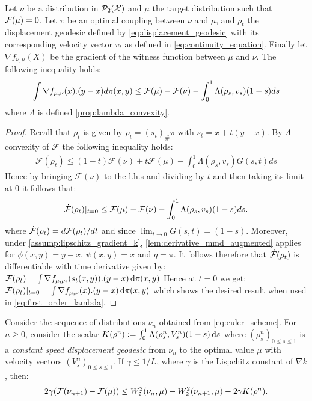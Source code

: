 \begin{lemma}	\label{lem:grad_flow_lambda_version}
	Let $\nu$ be a distribution in $\mathcal{P}_2({{\mathcal X}})$ and $\mu$ the target distribution such that ${{\mathcal F}}(\mu)=0$.  Let $\pi$ be an optimal coupling between $\nu$ and $\mu$, and $\rho_t$ the displacement geodesic defined by \cref{eq:displacement_geodesic} with its corresponding velocity vector  $v_t$ as defined in \cref{eq:continuity_equation}. Finally let $\nabla f_{\nu,\mu}(X)$ be the gradient of the witness function between $\mu$ and $\nu$. The following inequality holds: %
	\begin{align*}
	\int \nabla f_{\mu, \nu}(x).(y-x) d\pi(x,y)
	\leq
	{{\mathcal F}}(\mu)- {{\mathcal F}}(\nu) -\int_0^1 \Lambda(\rho_s,v_s)(1-s)ds
	\end{align*}
	where $\Lambda$ is defined \cref{prop:lambda_convexity}.
\end{lemma}
\begin{proof}
	Recall that $\rho_t$ is given by $\rho_t = (s_t)_{\#}\pi$ with $s_t = x + t(y-x)$. By $\Lambda$-convexity of $\mathcal{F}$ the following inequality holds:
	\begin{align*}
	\mathcal{F}(\rho_{t})\leq (1-t)\mathcal{F}(\nu)+t \mathcal{F}(\mu) - \int_0^1 \Lambda(\rho_s,v_s)G(s,t)ds
	\end{align*}
	Hence by bringing $\mathcal{F}(\nu)$ to the l.h.s and dividing by $t$ and then taking its limit at $0$ it follows that:
	\begin{align}\label{eq:first_order_lambda}
	\dot{{{\mathcal F}}}(\rho_t)\vert_{t=0}\leq \mathcal	{F}(\mu)-\mathcal{F}(\nu)-\int_0^1 \Lambda(\rho_s,v_s)(1-s)ds.	
	\end{align}
	where $\dot{{{\mathcal F}}}(\rho_t)=d{{\mathcal F}}(\rho_t)/dt$ and since $\lim_{t \rightarrow 0}G(s,t)=(1-s)$.
	Moreover, under \cref{assump:lipschitz_gradient_k}, \cref{lem:derivative_mmd_augmented} applies for $\phi(x,y) = y-x$, $\psi(x,y)= x$ and $q = \pi$. It follows therefore that $\dot{{{\mathcal F}}}(\rho_t)$ is differentiable with time derivative given by:
	$\dot{{{\mathcal F}}}(\rho_t) = \int \nabla f_{\mu,\rho_t}(s_t(x,y)).(y-x)\mathop{}\!\mathrm{d} \pi(x,y)$
Hence at $t=0$ we get: $\dot{{{\mathcal F}}}(\rho_t)\vert_{t=0} = \int \nabla f_{\mu,\nu}(x).(y-x)\mathop{}\!\mathrm{d} \pi(x,y)$ which shows the desired result when used in \cref{eq:first_order_lambda}.
\end{proof}


\begin{proposition}\label{prop:evi}
	Consider the sequence of distributions $\nu_n$ obtained from \cref{eq:euler_scheme}. For $n\ge 0$, consider the scalar
	 $ K(\rho^n) :=  \int_0^1\Lambda(\rho_s^n,V_s^n)(1-s)\mathop{}\!\mathrm{d} s$ where $(\rho_s^n)_{0\leq s\leq 1}$ is a \textit{constant speed displacement geodesic} from $\nu_n$ to the optimal value $\mu$ with velocity vectors $(V_s^n)_{0\leq s\leq 1}$. If $\gamma \leq 1/L$, where $\gamma$ is the Lispchitz constant of $\nabla k$, then:
	\begin{align}
	2\gamma({{\mathcal F}}(\nu_{n+1})-{{\mathcal F}}(\mu))
	\leq 
	W_2^2(\nu_n,\mu)-W_2^2(\nu_{n+1},\mu)-2\gamma K(\rho^n).
	\label{eq:evi}
	\end{align}
\end{proposition}


